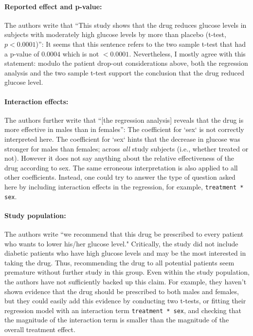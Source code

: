 \begin{enumerate}[label=(\alph*)]
\paragraph{Reported effect and p-value:} The authors write that ``This study shows that the drug reduces glucose levels in subjects with moderately high glucose levels by more than placebo (t-test, $p < 0.0001$)'': It seems that this sentence refers to the two sample t-test that had a p-value of $0.0004$ which is not $< 0.0001$. Nevertheless, I mostly agree with this statement: modulo the patient drop-out considerations above, both the regression analysis and the two sample t-test support the conclusion that the drug reduced glucose level.

\paragraph{Interaction effects:} The authors further write that ``[the regression analysis] reveals that the drug is more effective in males than in females'': The coefficient for `sex` is not correctly interpreted here. The coefficient for `sex` hints that the decrease in glucose was stronger for males than females; across \emph{all} study subjects (i.e., whether treated or not). However it does not say anything about the relative effectiveness of the drug according to sex. The same erroneous interpretation is also applied to all other coefficients. Instead, one could try to answer the type of question asked here by including interaction effects in the regression, for example, \texttt{treatment * sex}. 

\paragraph{Study population:} The authors write ``we recommend that this drug be prescribed to every patient who wants to lower his/her glucose level." Critically, the study did not include diabetic patients who have high glucose levels and may be the most interested in taking the drug. Thus, recommending the drug to all potential patients seem premature without further study in this group. Even within the study population, the authors have not sufficiently backed up this claim. For example, they haven't shown evidence that the drug should be prescribed to both males and females, but they could easily add this evidence by conducting two t-tests, or fitting their regression model with an interaction term \texttt{treatment * sex}, and checking that the magnitude of the interaction term is smaller than the magnitude of the overall treatment effect.


\end{enumerate}
